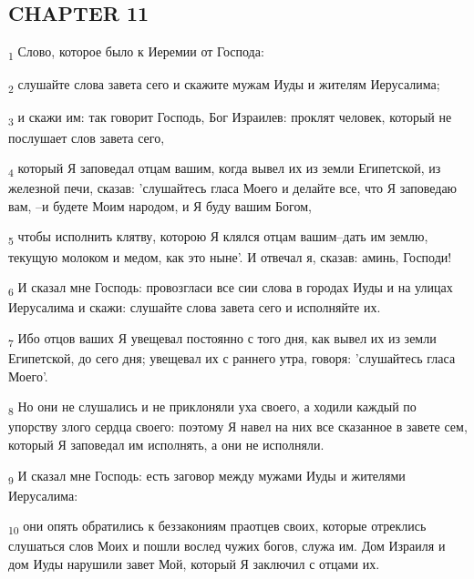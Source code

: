\subsection{CHAPTER 11}
\begin{tcolorbox}
\textsubscript{1} Слово, которое было к Иеремии от Господа:
\end{tcolorbox}
\begin{tcolorbox}
\textsubscript{2} слушайте слова завета сего и скажите мужам Иуды и жителям Иерусалима;
\end{tcolorbox}
\begin{tcolorbox}
\textsubscript{3} и скажи им: так говорит Господь, Бог Израилев: проклят человек, который не послушает слов завета сего,
\end{tcolorbox}
\begin{tcolorbox}
\textsubscript{4} который Я заповедал отцам вашим, когда вывел их из земли Египетской, из железной печи, сказав: 'слушайтесь гласа Моего и делайте все, что Я заповедаю вам, --и будете Моим народом, и Я буду вашим Богом,
\end{tcolorbox}
\begin{tcolorbox}
\textsubscript{5} чтобы исполнить клятву, которою Я клялся отцам вашим--дать им землю, текущую молоком и медом, как это ныне'. И отвечал я, сказав: аминь, Господи!
\end{tcolorbox}
\begin{tcolorbox}
\textsubscript{6} И сказал мне Господь: провозгласи все сии слова в городах Иуды и на улицах Иерусалима и скажи: слушайте слова завета сего и исполняйте их.
\end{tcolorbox}
\begin{tcolorbox}
\textsubscript{7} Ибо отцов ваших Я увещевал постоянно с того дня, как вывел их из земли Египетской, до сего дня; увещевал их с раннего утра, говоря: 'слушайтесь гласа Моего'.
\end{tcolorbox}
\begin{tcolorbox}
\textsubscript{8} Но они не слушались и не приклоняли уха своего, а ходили каждый по упорству злого сердца своего: поэтому Я навел на них все сказанное в завете сем, который Я заповедал им исполнять, а они не исполняли.
\end{tcolorbox}
\begin{tcolorbox}
\textsubscript{9} И сказал мне Господь: есть заговор между мужами Иуды и жителями Иерусалима:
\end{tcolorbox}
\begin{tcolorbox}
\textsubscript{10} они опять обратились к беззакониям праотцев своих, которые отреклись слушаться слов Моих и пошли вослед чужих богов, служа им. Дом Израиля и дом Иуды нарушили завет Мой, который Я заключил с отцами их.
\end{tcolorbox}
